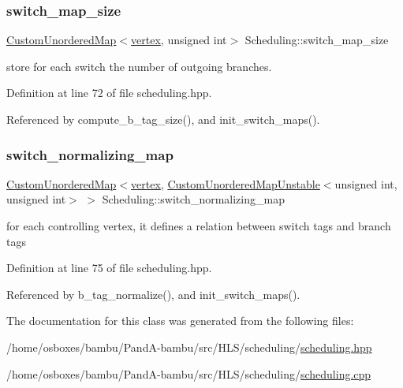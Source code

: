 \subsubsection{\texorpdfstring{switch\+\_\+map\+\_\+size}{switch\_map\_size}}
{\footnotesize\ttfamily \hyperlink{custom__map_8hpp_ad1ed68f2ff093683ab1a33522b144adc}{Custom\+Unordered\+Map}$<$\hyperlink{graph_8hpp_abefdcf0544e601805af44eca032cca14}{vertex}, unsigned int$>$ Scheduling\+::switch\+\_\+map\+\_\+size\hspace{0.3cm}{\ttfamily [private]}}



store for each switch the number of outgoing branches. 



Definition at line 72 of file scheduling.\+hpp.



Referenced by compute\+\_\+b\+\_\+tag\+\_\+size(), and init\+\_\+switch\+\_\+maps().

\mbox{\label{classScheduling_a315d450347600d0a0f41087e8d2525ad}} 
\subsubsection{\texorpdfstring{switch\+\_\+normalizing\+\_\+map}{switch\_normalizing\_map}}
{\footnotesize\ttfamily \hyperlink{custom__map_8hpp_ad1ed68f2ff093683ab1a33522b144adc}{Custom\+Unordered\+Map}$<$\hyperlink{graph_8hpp_abefdcf0544e601805af44eca032cca14}{vertex}, \hyperlink{custom__map_8hpp_a8cbaceffc09790a885ec7e9c17809c69}{Custom\+Unordered\+Map\+Unstable}$<$unsigned int, unsigned int$>$ $>$ Scheduling\+::switch\+\_\+normalizing\+\_\+map\hspace{0.3cm}{\ttfamily [private]}}



for each controlling vertex, it defines a relation between switch tags and branch tags 



Definition at line 75 of file scheduling.\+hpp.



Referenced by b\+\_\+tag\+\_\+normalize(), and init\+\_\+switch\+\_\+maps().



The documentation for this class was generated from the following files\+:\begin{DoxyCompactItemize}
\item 
/home/osboxes/bambu/\+Pand\+A-\/bambu/src/\+H\+L\+S/scheduling/\hyperlink{scheduling_8hpp}{scheduling.\+hpp}\item 
/home/osboxes/bambu/\+Pand\+A-\/bambu/src/\+H\+L\+S/scheduling/\hyperlink{scheduling_8cpp}{scheduling.\+cpp}\end{DoxyCompactItemize}
